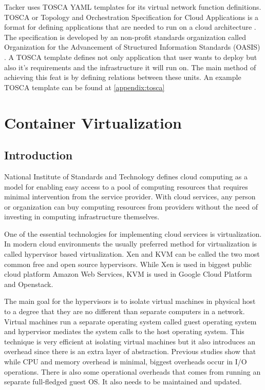 \documentclass[12pt,oneandhalf,chaparabic,ceng,ms,eng,oneside,pntc]{gsufbe}
\begin{document}
Tacker uses TOSCA YAML templates for its virtual network function definitions. TOSCA or Topology and
Orchestration Specification for Cloud Applications is a format for defining applications that are needed
to run on a cloud architecture \cite{oasis_tosca}. The specification is developed by an non-profit standards organization
called Organization for the Advancement of Structured Information Standards (OASIS) \cite{oasis}.
A TOSCA template defines not only application that user wants to deploy but also
it's requirements and the infrastructure it will run on. The main method of achieving
this feat is by defining relations between these units. An example TOSCA template can be found at
\ref{appendix:tosca}


\chapter{Container Virtualization}
\section{Introduction}
National Institute of Standards and Technology defines cloud computing as a model for enabling
easy access to a pool of computing resources that requires minimal intervention from the service
provider. With cloud services, any person or organization can buy computing resources from providers
without the need of investing in computing infrastructure themselves. 

One of the essential technologies for implementing cloud services is virtualization. In modern cloud
environments the usually preferred method for virtualization is called hypervisor based virtualization.
Xen and KVM can be called the two most common free and open source hypervisors. While Xen is used in
biggest public cloud platform Amazon Web Services, KVM is used in Google Cloud Platform and Openstack.

The main goal for the hypervisors is to isolate virtual machines in physical host to a degree that they
are no different than separate computers in a network. Virtual machines run a separate operating system
called guest operating system and hypervisor mediates the system calls to the host operating system.
This technique is very efficient at isolating virtual machines but it also introduces an overhead
since there is an extra layer of abstraction. Previous studies show that while CPU and memory overhead
is minimal, biggest overheads occur in I/O operations. \cite{hwang_component_based_2013} There is also
some operational overheads that
comes from running an separate full-fledged guest OS. It also needs to be maintained and updated.
\end{document}
